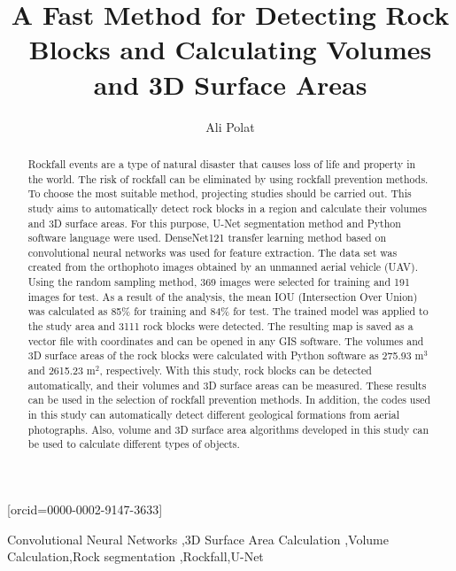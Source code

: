 \documentclass[a4paper,fleqn]{cas-sc}
\begin{document}
\let\WriteBookmarks\relax
\def\floatpagepagefraction{1}
\def\textpagefraction{.001}

\title [mode = title]{A Fast Method for Detecting Rock Blocks and Calculating Volumes and 3D Surface Areas}


\author[0]{Ali Polat}[orcid=0000-0002-9147-3633]




\address[0]{Provincial Directorate of Disaster and Emergency, 58000, Sivas, Turkey}


\begin{abstract}
Rockfall events are a type of natural disaster that causes loss of life and property in the world. The risk of rockfall can be eliminated by using rockfall prevention methods. To choose the most suitable method, projecting studies should be carried out. This study aims to automatically detect rock blocks in a region and calculate their volumes and 3D surface areas. For this purpose, U-Net segmentation method and Python software language were used. DenseNet121 transfer learning method based on convolutional neural networks was used for feature extraction. The data set was created from the orthophoto images obtained by an unmanned aerial vehicle (UAV). Using the random sampling method, 369 images were selected for training and 191 images for test. As a result of the analysis, the mean IOU (Intersection Over Union) was calculated as 85\% for training and 84\% for test. The trained model was applied to the study area and 3111 rock blocks were detected. The resulting map is saved as a vector file with coordinates and can be opened in any GIS software. The volumes and 3D surface areas of the rock blocks were calculated with Python software as 275.93 m$^3$ and 2615.23 m$^2$, respectively. With this study, rock blocks can be detected automatically, and their volumes and 3D surface areas can be measured. These results can be used in the selection of rockfall prevention methods. In addition, the codes used in this study can automatically detect different geological formations from aerial photographs. Also, volume and 3D surface area algorithms developed in this study can be used to calculate different types of objects.
\end{abstract}
 



\begin{keywords}
Convolutional Neural Networks \sep 3D Surface Area Calculation \sep Volume Calculation\sep  Rock segmentation \sep  Rockfall\sep U-Net
\end{keywords}
\end{document}
